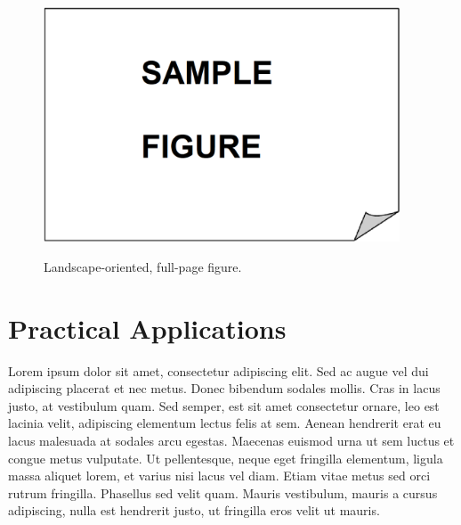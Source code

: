 \begin{landscape}
\thispagestyle{empty}
 \begin{figure}[!ht]
 \vspace{-2mm}
 \centering
 \includegraphics[width=300pt,keepaspectratio=true]{./fig/sekil3}
 \vspace{4mm}
 \caption{Landscape-oriented, full-page figure.}    
      \vspace{40mm} %
      \hspace{0cm}\pageref{fig:landscape_figure}   %
      \label{fig:landscape_figure}
\end{figure}
\end{landscape}

\section{Practical Applications}

Lorem ipsum dolor sit amet, consectetur adipiscing elit. Sed ac augue vel dui 
adipiscing placerat et nec metus. Donec bibendum sodales mollis. Cras in lacus 
justo, at vestibulum quam. Sed semper, est sit amet consectetur ornare, leo est 
lacinia velit, adipiscing elementum lectus felis at sem. Aenean hendrerit erat eu 
lacus malesuada at sodales arcu egestas. Maecenas euismod urna ut sem luctus et 
congue metus vulputate. Ut pellentesque, neque eget fringilla elementum, ligula 
massa aliquet lorem, et varius nisi lacus vel diam. Etiam vitae metus sed orci 
rutrum fringilla. Phasellus sed velit quam. Mauris vestibulum, mauris a cursus 
adipiscing, nulla est hendrerit justo, ut fringilla eros velit ut mauris.

